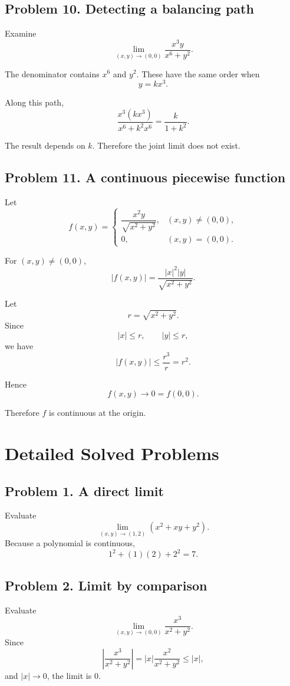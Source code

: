 \documentclass[11pt,oneside]{book}
\theoremstyle{studentthm}
\theoremstyle{definition}
\newcommand{\abs}[1]{\left|#1\right|}
\begin{document}
\subsection*{Problem 10. Detecting a balancing path}

Examine
\[
\lim_{(x,y)\to(0,0)}
\frac{x^3y}{x^6+y^2}.
\]

The denominator contains \(x^6\) and \(y^2\). These have the same order
when
\[
y=kx^3.
\]

Along this path,
\[
\frac{x^3(kx^3)}{x^6+k^2x^6}
=
\frac{k}{1+k^2}.
\]

The result depends on \(k\). Therefore the joint limit does not exist.

\subsection*{Problem 11. A continuous piecewise function}

Let
\[
f(x,y)
=
\begin{cases}
\dfrac{x^2y}{\sqrt{x^2+y^2}},&(x,y)\ne(0,0),\\[1ex]
0,&(x,y)=(0,0).
\end{cases}
\]

For \((x,y)\ne(0,0)\),
\[
|f(x,y)|
=
\frac{|x|^2|y|}{\sqrt{x^2+y^2}}.
\]

Let
\[
r=\sqrt{x^2+y^2}.
\]
Since
\[
|x|\le r,\qquad |y|\le r,
\]
we have
\[
|f(x,y)|
\le
\frac{r^3}{r}
=
r^2.
\]

Hence
\[
f(x,y)\to0=f(0,0).
\]

Therefore \(f\) is continuous at the origin.


\section{Detailed Solved Problems}

\subsection*{Problem 1. A direct limit}
Evaluate
\[
\lim_{(x,y)\to(1,2)}(x^2+xy+y^2).
\]
Because a polynomial is continuous,
\[
1^2+(1)(2)+2^2=7.
\]

\subsection*{Problem 2. Limit by comparison}
Evaluate
\[
\lim_{(x,y)\to(0,0)}
\frac{x^3}{x^2+y^2}.
\]
Since
\[
\abs{\frac{x^3}{x^2+y^2}}
=
\abs{x}\frac{x^2}{x^2+y^2}
\le\abs{x},
\]
and \(\abs{x}\to0\), the limit is \(0\).
\end{document}
